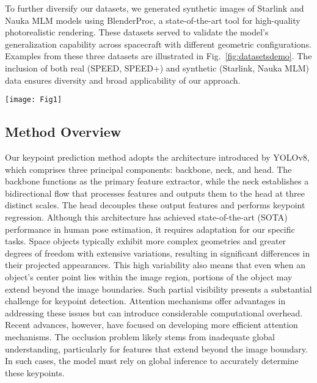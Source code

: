 \documentclass[a4paper,fleqn]{cas-sc}
\begin{document}
To further diversify our datasets, we generated synthetic images of Starlink and Nauka MLM models using BlenderProc, a state-of-the-art tool for high-quality photorealistic rendering. These datasets served to validate the model's generalization capability across spacecraft with different geometric configurations. Examples from these three datasets are illustrated in Fig.~\ref{fig:datasetsdemo}. The inclusion of both real (SPEED, SPEED+) and synthetic (Starlink, Nauka MLM) data ensures diversity and broad applicability of our approach.

\begin{figure*}[!htbp]
	\centering
	\texttt{[image: Fig1]} 
	\caption{Representative examples from the three datasets employed in this study: SPEED+, an open dataset provided by ESA, and Nauka MLM and Starlink, our synthetic datasets generated for comprehensive evaluation.}
	\label{fig:datasetsdemo}
\end{figure*}

\subsection{Method Overview}\label{sec:Method_Overview}
Our keypoint prediction method adopts the architecture introduced by YOLOv8, which comprises three principal components: backbone, neck, and head. The backbone functions as the primary feature extractor, while the neck establishes a bidirectional flow that processes features and outputs them to the head at three distinct scales. The head decouples these output features and performs keypoint regression. Although this architecture has achieved state-of-the-art (SOTA) performance in human pose estimation, it requires adaptation for our specific tasks. Space objects typically exhibit more complex geometries and greater degrees of freedom with extensive variations, resulting in significant differences in their projected appearances. This high variability also means that even when an object's center point lies within the image region, portions of the object may extend beyond the image boundaries. Such partial visibility presents a substantial challenge for keypoint detection. Attention mechanisms offer advantages in addressing these issues but can introduce considerable computational overhead. Recent advances, however, have focused on developing more efficient attention mechanisms. The occlusion problem likely stems from inadequate global understanding, particularly for features that extend beyond the image boundary. In such cases, the model must rely on global inference to accurately determine these keypoints.
\end{document}
